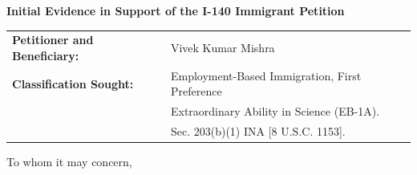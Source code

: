 \documentclass[11pt]{article}
\begin{document}
\vspace{4em}


\begin{center}
 \Large{\textbf{Initial Evidence in Support of the I-140 Immigrant Petition}}
\end{center}

\vspace{4em}


\begin{tabular}{ll}
\textbf{Petitioner and Beneficiary:} & Vivek Kumar Mishra\\
\textbf{Classification Sought:} & Employment-Based Immigration, First Preference\\
& Extraordinary Ability in Science (EB-1A).\\
& Sec. 203(b)(1) INA [8 U.S.C. 1153].\\
\end{tabular}

\vspace{2em}


To whom it may concern,

\vspace{2em}



\newcommand{\fie}{Artificial Intelligence, Machine Learning, and Software Engineering}
\newcommand{\dr}{Mr. Vivek Mishra }
\newcommand{\drs}{Mr. Vivek Mishra's }

\newcommand{\qu}[1]{\say{\emph{#1}}}

\newcommand{\pg}{(QR, Professor of EECS, MIT)\\}
\newcommand{\ty}{(UZ, Professor of Electrical and Computer Engineering, Univ A)\\}
\newcommand{\fb}{(GC, Professor of Neuroradiology, University of ABC)\\}
\newcommand{\se}{(TF, Professor of Neuropsychology, XYZ)\\}
\newcommand{\sh}{(TI, Vice President of M, Company XYZ, USA)\\}
\newcommand{\ch}{(DI, Senior Director of XYZ, Company ABC, USA)\\}
\newcommand{\eb}{(FC, Professor at UV)\\}
\end{document}
